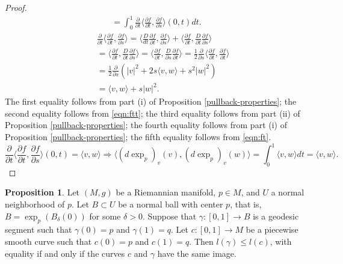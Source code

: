 \documentclass{amsart}
\numberwithin{equation}{section}
\theoremstyle{definition}
\theoremstyle{theorem}
\newtheorem{proposition}[definition]{Proposition}
\begin{document}
\begin{proof}
\begin{eqnarray*}
= \int_0^1 \frac{\partial}{\partial t} \langle \frac{\partial f}{\partial t}, \frac{\partial f}{\partial s}\rangle(0,t) dt.
\end{eqnarray*}
\begin{eqnarray*}
&& \frac{\partial}{\partial t}\langle \frac{\partial f}{\partial t},\frac{\partial f}{\partial s}\rangle  = 
\langle \frac{D}{dt}\frac{\partial f}{\partial t}, \frac{\partial f}{\partial s}\rangle 
+ \langle \frac{\partial f}{\partial t},\frac{D}{\partial t}\frac{\partial f}{\partial s}\rangle \\
&& = \langle \frac{\partial f}{\partial t},\frac{D}{\partial t}\frac{\partial f}{\partial s}\rangle 
=  \langle \frac{\partial f}{\partial t},\frac{D}{\partial s}\frac{\partial f}{\partial t}\rangle 
= \frac{1}{2}\frac{\partial}{\partial s}\langle  \frac{\partial f}{\partial t},  \frac{\partial f}{\partial t}\rangle\\
&& = \frac{1}{2}\frac{\partial}{\partial s} (|v|^2 + 2s \langle v,w\rangle + s^2|w|^2) \\
&& = \langle v,w \rangle + s |w|^2.
\end{eqnarray*} 
The first equality follows from part (i) of Proposition \ref{pullback-properties}; 
the second equality follows from \eqref{eqn:ftt};
the third equality follows from part (ii) of Proposition \ref{pullback-properties};
the fourth equality follows from part (i) of Proposition \ref{pullback-properties};
the fifth equality follows from \eqref{eqn:ft}.
$$
\frac{\partial}{\partial t}\langle \frac{\partial f}{\partial t},\frac{\partial f}{\partial s}\rangle(0,t) 
=  \langle v,w\rangle \Rightarrow
\langle (d \exp_p)_v(v), (d \exp_p)_v(w) \rangle =\int_0^1 \langle v,w\rangle dt =\langle v, w\rangle.
$$
\end{proof}


\begin{proposition}
Let $(M,g)$ be a Riemannian manifold, $p \in M$, and $U$ a normal neighborhood of $p$. Let $B \subset U$ be a normal ball with center $p$, that is, $B = \exp_p(B_\delta(0))$ for some $\delta > 0$. Suppose that $\gamma : [0,1] \to B$ is a geodesic segment such that $\gamma(0) = p$ and $\gamma(1) = q$. Let $c : [0,1] \to M$ be a piecewise smooth curve such that
$c(0)=p$ and $c(1)=q$. Then $l(\gamma) \le l(c)$, with equality if and only if the curves $c$ and $\gamma$ have the same image.
\end{proposition}
\end{document}

